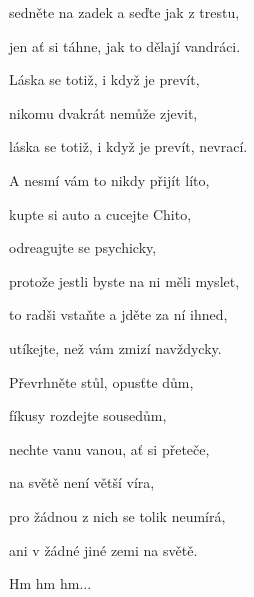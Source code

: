 sedněte na zadek a seďte jak z trestu,

jen ať si táhne, jak to dělají vandráci.

Láska se totiž, i když je prevít,

nikomu dvakrát nemůže zjevit,

láska se totiž, i když je prevít, nevrací.
\ks

\zs
A nesmí vám to nikdy přijít líto,

kupte si auto a cucejte Chito,

odreagujte se psychicky,

protože jestli byste na ni měli myslet,

to radši vstaňte a jděte za ní ihned,

utíkejte, než vám zmizí navždycky.
\ks

\zr
Převrhněte stůl, opusťte dům,

fíkusy rozdejte sousedům,

nechte vanu vanou, ať si přeteče,

na světě není větší víra,

pro žádnou z nich se tolik neumírá,

ani v žádné jiné zemi na světě.
\kr

\zr
Hm hm hm...
\kr

\kp
